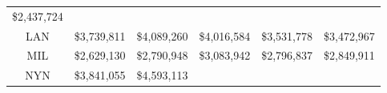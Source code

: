 \documentclass[]{book}
\theoremstyle{definition}
\theoremstyle{definition}
\theoremstyle{definition}
\theoremstyle{remark}
\begin{document}
\begin{longtable}[]{@{}cccccc@{}}
\begin{minipage}[t]{0.15\columnwidth}
\$2,437,724\strut
\end{minipage}\tabularnewline
\begin{minipage}[t]{0.09\columnwidth}\centering
LAN\strut
\end{minipage} & \begin{minipage}[t]{0.15\columnwidth}\centering
\$3,739,811\strut
\end{minipage} & \begin{minipage}[t]{0.15\columnwidth}\centering
\$4,089,260\strut
\end{minipage} & \begin{minipage}[t]{0.15\columnwidth}\centering
\$4,016,584\strut
\end{minipage} & \begin{minipage}[t]{0.15\columnwidth}\centering
\$3,531,778\strut
\end{minipage} & \begin{minipage}[t]{0.15\columnwidth}\centering
\$3,472,967\strut
\end{minipage}\tabularnewline
\begin{minipage}[t]{0.09\columnwidth}\centering
MIL\strut
\end{minipage} & \begin{minipage}[t]{0.15\columnwidth}\centering
\$2,629,130\strut
\end{minipage} & \begin{minipage}[t]{0.15\columnwidth}\centering
\$2,790,948\strut
\end{minipage} & \begin{minipage}[t]{0.15\columnwidth}\centering
\$3,083,942\strut
\end{minipage} & \begin{minipage}[t]{0.15\columnwidth}\centering
\$2,796,837\strut
\end{minipage} & \begin{minipage}[t]{0.15\columnwidth}\centering
\$2,849,911\strut
\end{minipage}\tabularnewline
\begin{minipage}[t]{0.09\columnwidth}\centering
NYN\strut
\end{minipage} & \begin{minipage}[t]{0.15\columnwidth}\centering
\$3,841,055\strut
\end{minipage} & \begin{minipage}[t]{0.15\columnwidth}\centering
\$4,593,113\strut
\end{minipage} & \begin{minipage}[t]{0.15\columnwidth}\centering

\end{minipage}
\end{longtable}
\end{document}
